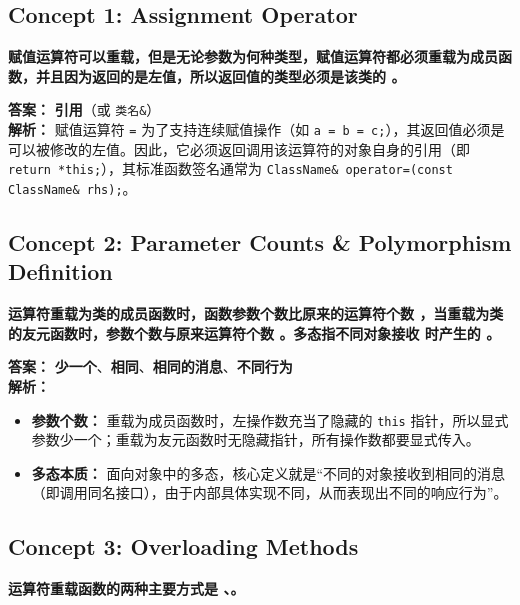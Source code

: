 \documentclass[11pt, a4paper]{article}
\begin{document}
\subsection*{Concept 1: Assignment Operator}
\textbf{赋值运算符可以重载，但是无论参数为何种类型，赋值运算符都必须重载为成员函数，并且因为返回的是左值，所以返回值的类型必须是该类的 \underline{\hspace{3cm}}。}

\vspace{0.5em}
\noindent \textbf{答案：} \textbf{引用}（或 \texttt{类名\&}）\\
\textbf{解析：} 赋值运算符 \texttt{=} 为了支持连续赋值操作（如 \texttt{a = b = c;}），其返回值必须是可以被修改的左值。因此，它必须返回调用该运算符的对象自身的引用（即 \texttt{return *this;}），其标准函数签名通常为 \texttt{ClassName\& operator=(const ClassName\& rhs);}。

\subsection*{Concept 2: Parameter Counts \& Polymorphism Definition}
\textbf{运算符重载为类的成员函数时，函数参数个数比原来的运算符个数 \underline{\hspace{2cm}}，当重载为类的友元函数时，参数个数与原来运算符个数 \underline{\hspace{2cm}}。多态指不同对象接收 \underline{\hspace{3cm}} 时产生的 \underline{\hspace{3cm}}。}

\vspace{0.5em}
\noindent \textbf{答案：} \textbf{少一个}、\textbf{相同}、\textbf{相同的消息}、\textbf{不同行为} \\
\textbf{解析：} 
\begin{itemize}
    \item \textbf{参数个数：} 重载为成员函数时，左操作数充当了隐藏的 \texttt{this} 指针，所以显式参数少一个；重载为友元函数时无隐藏指针，所有操作数都要显式传入。
    \item \textbf{多态本质：} 面向对象中的多态，核心定义就是“不同的对象接收到相同的消息（即调用同名接口），由于内部具体实现不同，从而表现出不同的响应行为”。
\end{itemize}

\subsection*{Concept 3: Overloading Methods}
\textbf{运算符重载函数的两种主要方式是 \underline{\hspace{3cm}}、\underline{\hspace{3cm}}。}
\end{document}
